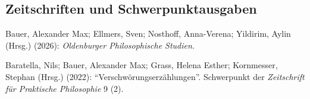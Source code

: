 \documentclass[a4paper,10pt]{article}
\newenvironment{literature}{%
   \parskip6pt\parindent0pt\raggedright
   \def\lititem{\hangindent=1cm\hangafter1}}{%
   \par\ignorespaces}
\begin{document}
\subsection*{Zeitschriften und Schwerpunktausgaben}
\begin{literature}
\lititem Bauer, Alexander Max; Ellmers, Sven; Nosthoff, Anna-Verena; Yildirim, Aylin (Hrsg.) (2026): \textit{Oldenburger Philosophische Studien}.

\lititem Baratella, Nils; Bauer, Alexander Max; Grass, Helena Esther; Kornmesser, Stephan (Hrsg.) (2022): \enquote{Verschwörungserzählungen}. Schwerpunkt der \textit{Zeitschrift für Praktische Philosophie} 9 (2).
\end{literature}


\end{document}
